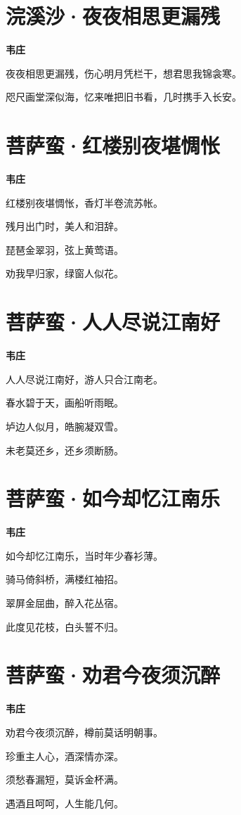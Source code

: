 \documentclass[12pt,a4paper]{ctexbook}
\begin{document}
\section{浣溪沙·夜夜相思更漏残}
\textbf{韦庄}\par\vspace{0.5em}
夜夜相思更漏残，伤心明月凭栏干，想君思我锦衾寒。\par
咫尺画堂深似海，忆来唯把旧书看，几时携手入长安。\par

\section{菩萨蛮·红楼别夜堪惆怅}
\textbf{韦庄}\par\vspace{0.5em}
红楼别夜堪惆怅，香灯半卷流苏帐。\par
残月出门时，美人和泪辞。\par
琵琶金翠羽，弦上黄莺语。\par
劝我早归家，绿窗人似花。\par

\section{菩萨蛮·人人尽说江南好}
\textbf{韦庄}\par\vspace{0.5em}
人人尽说江南好，游人只合江南老。\par
春水碧于天，画船听雨眠。\par
垆边人似月，皓腕凝双雪。\par
未老莫还乡，还乡须断肠。\par

\section{菩萨蛮·如今却忆江南乐}
\textbf{韦庄}\par\vspace{0.5em}
如今却忆江南乐，当时年少春衫薄。\par
骑马倚斜桥，满楼红袖招。\par
翠屏金屈曲，醉入花丛宿。\par
此度见花枝，白头誓不归。\par

\section{菩萨蛮·劝君今夜须沉醉}
\textbf{韦庄}\par\vspace{0.5em}
劝君今夜须沉醉，樽前莫话明朝事。\par
珍重主人心，酒深情亦深。\par
须愁春漏短，莫诉金杯满。\par
遇酒且呵呵，人生能几何。\par
\end{document}
